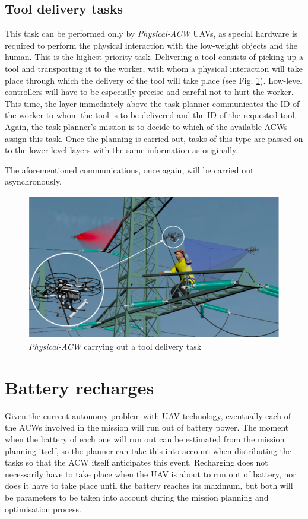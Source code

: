 \subsection{Tool delivery tasks}
\label{subsec:ToolDeliveryTasks}
This task can be performed only by \textit{Physical-ACW} \glspl{UAV}, as special hardware is required to perform the physical interaction with the low-weight objects and the human. This is the highest priority task. Delivering a tool consists of picking up a tool and transporting it to the worker, with whom a physical interaction will take place through which the delivery of the tool will take place (see Fig. \ref{fig:deliver_task}). Low-level controllers will have to be especially precise and careful not to hurt the worker. This time, the layer immediately above the task planner communicates the \gls{ID} of the worker to whom the tool is to be delivered and the \gls{ID} of the requested tool. Again, the task planner's mission is to decide to which of the available \glspl{ACW} assign this task. Once the planning is carried out, tasks of this type are passed on to the lower level layers with the same information as originally.

The aforementioned communications, once again, will be carried out asynchronously. 


\begin{figure}[htbp]
    \centering
    \includegraphics[width=0.7\linewidth]
    {ProblemFormulation/figures/deliver_task.png}
    \caption{\textit{Physical-ACW} carrying out a tool delivery task}
    \label{fig:deliver_task}
\end{figure}

\section{Battery recharges}
\label{sec:BatteryRecharges}
Given the current autonomy problem with \gls{UAV} technology, eventually each of the \glspl{ACW} involved in the mission will run out of battery power. The moment when the battery of each one will run out can be estimated from the mission planning itself, so the planner can take this into account when distributing the tasks so that the \gls{ACW} itself anticipates this event. Recharging does not necessarily have to take place when the \gls{UAV} is about to run out of battery, nor does it have to take place until the battery reaches its maximum, but both will be parameters to be taken into account during the mission planning and optimisation process.

